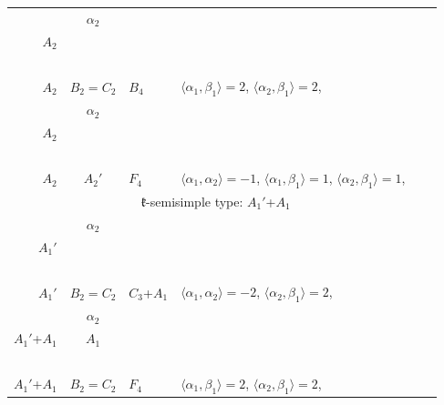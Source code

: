 \documentclass[12pt]{report}
\begin{document}
\begin{appendix}
{\begin{longtable}{rcl p{1cm}p{1cm}p{3cm} }
\\
\begin{tabular}{cc}$\alpha_1$+ & $\alpha_2$\\\tiny{ $A_2$ } & \tiny{  }\end{tabular} &\begin{tabular}{c} = \\~ \end{tabular} & \begin{tabular}{c}$\beta_1$\\\tiny{ $A_2$ }\end{tabular} & $B_2=C_2$ & $B_4$ &  $\langle\alpha_1, \beta_1\rangle=2$, $\langle\alpha_2, \beta_1\rangle=2$, 
\\
\begin{tabular}{cc}$\alpha_1$+ & $\alpha_2$\\\tiny{ $A_2$ } & \tiny{  }\end{tabular} &\begin{tabular}{c} = \\~ \end{tabular} & \begin{tabular}{c}$\beta_1$\\\tiny{ $A_2$ }\end{tabular} & $A_2'$ & $F_4$ & $\langle\alpha_1, \alpha_2\rangle=-1$,  $\langle\alpha_1, \beta_1\rangle=1$, $\langle\alpha_2, \beta_1\rangle=1$, 
\\
\hline\multicolumn{5}{c}{$\mathfrak{k}$-semisimple type: $A_1'$+$A_1$}\\
\hline\hline\begin{tabular}{cc}$\alpha_1$+ & $\alpha_2$\\\tiny{ $A_1'$ } & \tiny{  }\end{tabular} &\begin{tabular}{c} = \\~ \end{tabular} & \begin{tabular}{c}$\beta_1$\\\tiny{ $A_1'$ }\end{tabular} & $B_2=C_2$ & $C_3$+$A_1$ & $\langle\alpha_1, \alpha_2\rangle=-2$,  $\langle\alpha_2, \beta_1\rangle=2$, 
\\
\begin{tabular}{cc}$\alpha_1$+ & $\alpha_2$\\\tiny{ $A_1'$+$A_1$ } & \tiny{ $A_1$ }\end{tabular} &\begin{tabular}{c} = \\~ \end{tabular} & \begin{tabular}{c}2$\beta_1$\\\tiny{ $A_1'$+$A_1$ }\end{tabular} & $B_2=C_2$ & $F_4$ &  $\langle\alpha_1, \beta_1\rangle=2$, $\langle\alpha_2, \beta_1\rangle=2$, 

\end{longtable}}
\end{appendix}
\end{document}

